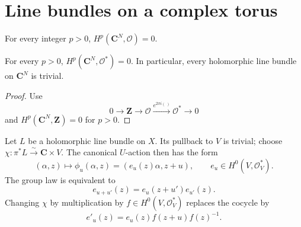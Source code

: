 \section{Line bundles on a complex torus}
\label{mumford-frag-I2}

\begin{theorem}
\label{mumford-frag-affine-vanishing}
For every integer $p>0$, $H^p(\mathbf C^N,\mathcal O)=0$.
\end{theorem}

\begin{corollary}
\label{mumford-frag-affine-line-bundles}
For every $p>0$, $H^p(\mathbf C^N,\mathcal O^*)=0$.  In particular, every
holomorphic line bundle on $\mathbf C^N$ is trivial.
\end{corollary}
\begin{proof}
Use
\[
 0\longrightarrow\mathbf Z\longrightarrow\mathcal O
 \xrightarrow{e^{2\pi i(\ )}}\mathcal O^*\longrightarrow0
\]
and $H^p(\mathbf C^N,\mathbf Z)=0$ for $p>0$.
\end{proof}

Let $L$ be a holomorphic line bundle on $X$.  Its pullback to $V$ is trivial;
choose $\chi:\pi^*L\xrightarrow{\sim}\mathbf C\times V$.  The canonical
$U$-action then has the form
\[
 (\alpha,z)\longmapsto\phi_u(\alpha,z)=(e_u(z)\alpha,z+u),
 \qquad e_u\in H^0(V,\mathcal O_V^*).
 \tag{A}
\]
The group law is equivalent to
\[
 e_{u+u'}(z)=e_u(z+u')e_{u'}(z).
\]
Changing $\chi$ by multiplication by $f\in H^0(V,\mathcal O_V^*)$ replaces
the cocycle by
\[
 e'_u(z)=e_u(z)f(z+u)f(z)^{-1}.
\]

